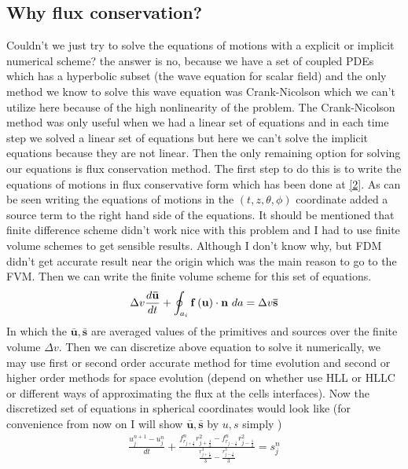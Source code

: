 \documentclass[a4paper,11pt]{article}
\begin{document}
 \subsection{Why flux conservation?}
 Couldn't we just try to solve the equations of motions with a explicit or implicit numerical scheme? the answer is no, because we have a set of coupled PDEs which has a hyperbolic subset (the wave equation for scalar field) and the only method we know to solve this wave equation was Crank-Nicolson which we can't utilize here because of the high nonlinearity of the problem. The Crank-Nicolson method was only useful when we had a linear set of equations and in each time step we solved a linear set of equations but here we can't solve the implicit equations because they are not linear. Then the only remaining option for solving our equations is flux conservation method. The first step to do this is to write the equations of motions in flux conservative form which has been done at \ref{2}. As can be seen writing the equations of motions in the $(t,z,\theta,\phi)$ coordinate added a source term to the right hand side of the equations. It should be mentioned that finite difference scheme didn't work nice with this problem and I had to use finite volume schemes to get sensible results. Although I don't know why, but FDM didn't get accurate result near the origin which was the main reason to go to the FVM.
 Then we can write the finite volume scheme for this set of equations.
 \begin{align}
 	\Delta v {{d {\mathbf {\bar u} }} \over {dt}} + \oint _{a_{i} } 
 	{\mathbf f} \left( {\mathbf u } \right) \cdot {\mathbf n }\  da  =\Delta v \mathbf{\bar s}
 \end{align}
 In which the $\mathbf {\bar u} ,\mathbf {\bar s}$ are averaged values of the primitives and sources over the finite volume $\Delta v$. Then we can discretize  above equation to solve it numerically, we may use first or second order accurate method for time evolution and second or higher order methods for space evolution (depend on whether use HLL or HLLC or different ways of approximating the flux at the cells interfaces). Now the discretized set of equations in spherical coordinates would look like (for convenience from now on  I will show  $\mathbf {\bar u} ,\mathbf {\bar s}$  by $u,s$ simply )
 \begin{align*}
 	\frac{u^{n+1}_j-u^n_j}{dt}+\frac{f^n_{r_{j+\frac{1}{2}}} r_{j+\frac{1}{2}}^2 -f^n_{r_{j-\frac{1}{2}}} r_{j-\frac{1}{2}}^2}{\frac{r_{j+\frac{1}{2}}^3}{3}-\frac{r_{j-\frac{1}{2}}^3}{3}}=s^n_j
 \end{align*}
\end{document}
